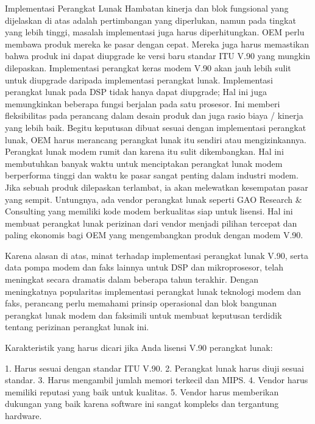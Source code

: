 Implementasi Perangkat Lunak
Hambatan kinerja dan blok fungsional yang dijelaskan di atas adalah pertimbangan yang diperlukan, namun pada tingkat yang lebih tinggi, masalah implementasi juga harus diperhitungkan. OEM perlu membawa produk mereka ke pasar dengan cepat. Mereka juga harus memastikan bahwa produk ini dapat diupgrade ke versi baru standar ITU V.90 yang mungkin dilepaskan. Implementasi perangkat keras modem V.90 akan jauh lebih sulit untuk diupgrade daripada implementasi perangkat lunak. Implementasi perangkat lunak pada DSP tidak hanya dapat diupgrade; Hal ini juga memungkinkan beberapa fungsi berjalan pada satu prosesor. Ini memberi fleksibilitas pada perancang dalam desain produk dan juga rasio biaya / kinerja yang lebih baik. Begitu keputusan dibuat sesuai dengan implementasi perangkat lunak, OEM harus merancang perangkat lunak itu sendiri atau mengizinkannya. Perangkat lunak modem rumit dan karena itu sulit dikembangkan. Hal ini membutuhkan banyak waktu untuk menciptakan perangkat lunak modem berperforma tinggi dan waktu ke pasar sangat penting dalam industri modem. Jika sebuah produk dilepaskan terlambat, ia akan melewatkan kesempatan pasar yang sempit. Untungnya, ada vendor perangkat lunak seperti GAO Research & Consulting yang memiliki kode modem berkualitas siap untuk lisensi. Hal ini membuat perangkat lunak perizinan dari vendor menjadi pilihan tercepat dan paling ekonomis bagi OEM yang mengembangkan produk dengan modem V.90.

Karena alasan di atas, minat terhadap implementasi perangkat lunak V.90, serta data pompa modem dan faks lainnya untuk DSP dan mikroprosesor, telah meningkat secara dramatis dalam beberapa tahun terakhir. Dengan meningkatnya popularitas implementasi perangkat lunak teknologi modem dan faks, perancang perlu memahami prinsip operasional dan blok bangunan perangkat lunak modem dan faksimili untuk membuat keputusan terdidik tentang perizinan perangkat lunak ini.

\sectionkarakteristik
Karakteristik yang harus dicari jika Anda lisensi V.90 perangkat lunak:

1. Harus sesuai dengan standar ITU V.90.
2. Perangkat lunak harus diuji sesuai standar.
3. Harus mengambil jumlah memori terkecil dan MIPS.
4. Vendor harus memiliki reputasi yang baik untuk kualitas.
5. Vendor harus memberikan dukungan yang baik karena software ini sangat kompleks dan tergantung hardware.

